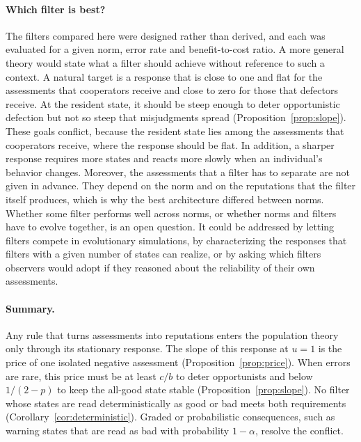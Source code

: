 \documentclass[10pt]{wlscirep}
\theoremstyle{plain}
\theoremstyle{remark}
\begin{document}
\paragraph{Which filter is best?} The filters compared here were designed rather than derived, and each was evaluated for a given norm, error rate and benefit-to-cost ratio. A more general theory would state what a filter should achieve without reference to such a context. A natural target is a response that is close to one and flat for the assessments that cooperators receive and close to zero for those that defectors receive. At the resident state, it should be steep enough to deter opportunistic defection but not so steep that misjudgments spread (Proposition~\ref{prop:slope}). These goals conflict, because the resident state lies among the assessments that cooperators receive, where the response should be flat. In addition, a sharper response requires more states and reacts more slowly when an individual's behavior changes. Moreover, the assessments that a filter has to separate are not given in advance. They depend on the norm and on the reputations that the filter itself produces, which is why the best architecture differed between norms. Whether some filter performs well across norms, or whether norms and filters have to evolve together, is an open question. It could be addressed by letting filters compete in evolutionary simulations, by characterizing the responses that filters with a given number of states can realize, or by asking which filters observers would adopt if they reasoned about the reliability of their own assessments.

\paragraph{Summary.} Any rule that turns assessments into reputations enters the population theory only through its stationary response. The slope of this response at $u=1$ is the price of one isolated negative assessment (Proposition~\ref{prop:price}). When errors are rare, this price must be at least $c/b$ to deter opportunists and below $1/(2-p)$ to keep the all-good state stable (Proposition~\ref{prop:slope}). No filter whose states are read deterministically as good or bad meets both requirements (Corollary~\ref{cor:deterministic}). Graded or probabilistic consequences, such as warning states that are read as bad with probability $1-\alpha$, resolve the conflict.

\FloatBarrier
\end{document}
